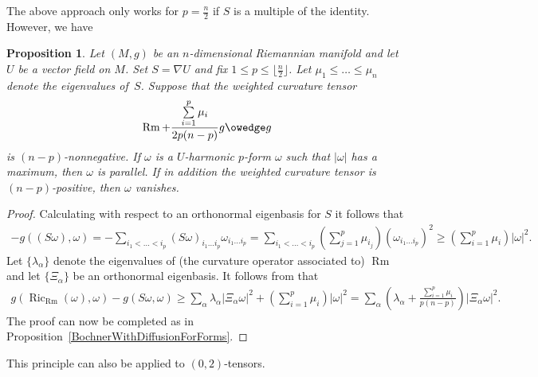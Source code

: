 \documentclass[10pt,a4paper]{amsart}
\numberwithin{equation}{section}
\newtheorem{Proposition}[Theorem]{Proposition}
{ \theoremstyle{definition}
\newtheorem{Remark}[Theorem]{Remark} }
\newcommand{\Ric} {\operatorname{Ric}}
\newcommand{\Rm} {\operatorname{Rm}}
\begin{document}
The above approach only works for $p = \frac{n}{2}$ if $S$ is a multiple of the identity. However, we have

\begin{Proposition}
Let $(M,g)$ be an $n$-dimensional Riemannian manifold and let $U$ be a vector field on $M$. Set $S= \nabla U$ and fix $1 \leq p \leq \big\lfloor \frac{n}{2}\big\rfloor$. Let $\mu_1 \leq \dots \leq \mu_n$ denote the eigenvalues of~$S$. Suppose that the weighted curvature tensor
\begin{gather*}
\Rm + \frac{\sum\limits_{i=1}^p \mu_i}{2p(n-p)} g \owedge g
\end{gather*}
is $(n-p)$-nonnegative. If $\omega$ is a $U$-harmonic $p$-form $\omega$ such that $|\omega|$ has a maximum, then $\omega$ is parallel. If in addition the weighted curvature tensor is $(n-p)$-positive, then $\omega$ vanishes.
\end{Proposition}
\begin{proof}Calculating with respect to an orthonormal eigenbasis for $S$ it follows that
\begin{gather*}
- g( (S \omega), \omega) = - \sum_{i_1 < \dots < i_p} (S \omega )_{i_1 \dots i_p} \omega_{i_1 \dots i_p}
 = \sum_{i_1 < \dots < i_p} \left( \sum_{j=1}^p \mu_{i_j} \right) ( \omega_{i_1 \dots i_p } )^2
 \geq \left( \sum_{i=1}^p \mu_{i} \right) | \omega |^2.
\end{gather*}
Let $\lbrace \lambda_{\alpha} \rbrace$ denote the eigenvalues of
(the curvature operator associated to)
$\Rm$ and let $\lbrace \Xi_{\alpha} \rbrace$ be an orthonormal eigenbasis. It follows from \cite[Proposition 1.6]{PetersenWinkBochner} that
\begin{align*}
g( \Ric_{\Rm}( \omega), \omega ) - g( S \omega, \omega)  \geq \sum_{\alpha} \lambda_{\alpha} | \Xi_{\alpha} \omega |^2 + \left( \sum_{i=1}^p \mu_i \!\right) | \omega |^2
  = \sum_{\alpha} \!\left(\! \lambda_{\alpha} + \frac{\sum\limits_{i=1}^p \mu_i}{p(n-p)}\! \right) | \Xi_{\alpha} \omega |^2.
\end{align*}
The proof can now be completed as in Proposition~\ref{BochnerWithDiffusionForForms}.
\end{proof}

This principle can also be applied to $(0,2)$-tensors.
\end{document}
